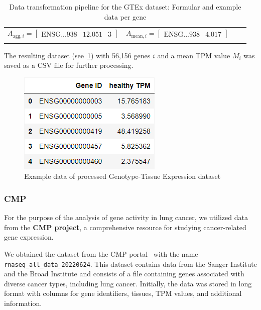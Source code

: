 \begin{table}[h]
{\begin{tabular}{|c|c|c|c|}
        $ A_{\text{agg}, i} = \begin{bmatrix}
            \text{ENSG...938} & 12.051 & 3
        \end{bmatrix}$ &

        $ A_{\text{mean}, i} = \begin{bmatrix}
            \text{ENSG...938} & 4.017
        \end{bmatrix}$ \\

        & & & \\[1mm] %
        \hline
    \end{tabular}
    }
    \caption{Data transformation pipeline for the GTEx dataset: Formular and example data per gene}\label{tab:gtex_table}
\end{table}

The resulting dataset (see~\cref{fig:03_01_df_GTEX_healthy_mean}) with 56,156 genes $i$
and a mean TPM value $M_i$ was saved as a CSV file for further processing.\\

\begin{figure}[h]
    \centering
    \includegraphics[height=\dfheight]{figures/03_01_GTEX_healthy_mean}
    \caption{Example data of processed Genotype-Tissue Expression dataset}
    \label{fig:03_01_df_GTEX_healthy_mean}
\end{figure}



\subsubsection*{CMP} \label{subsubsec:CMP}
For the purpose of the analysis of gene activity in lung cancer, we utilized data from the \textbf{CMP project},
a comprehensive resource for studying cancer-related gene expression.

We obtained the dataset from the CMP portal~\cite{cmp_download} with the name \texttt{rnaseq\_all\_data\_20220624}.
This dataset contains data from the Sanger Institute and the Broad Institute and
consists of a file containing genes associated with diverse cancer types, including lung cancer.
Initially, the data was stored in long format with columns for gene identifiers, tissues, TPM values,
and additional information.

